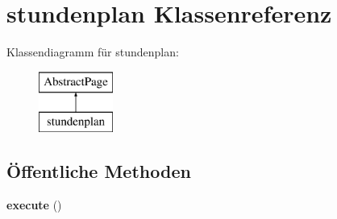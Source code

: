 \hypertarget{classstundenplan}{}\section{stundenplan Klassenreferenz}
\label{classstundenplan}
Klassendiagramm für stundenplan\+:\begin{figure}[H]
\begin{center}
\leavevmode
\includegraphics[height=2.000000cm]{classstundenplan}
\end{center}
\end{figure}
\subsection*{Öffentliche Methoden}
\begin{DoxyCompactItemize}
\item 
\mbox{\label{classstundenplan_ac109796bc94706cd9ca999e68f2833f3}} 
{\bfseries execute} ()
\end{DoxyCompactItemize}
